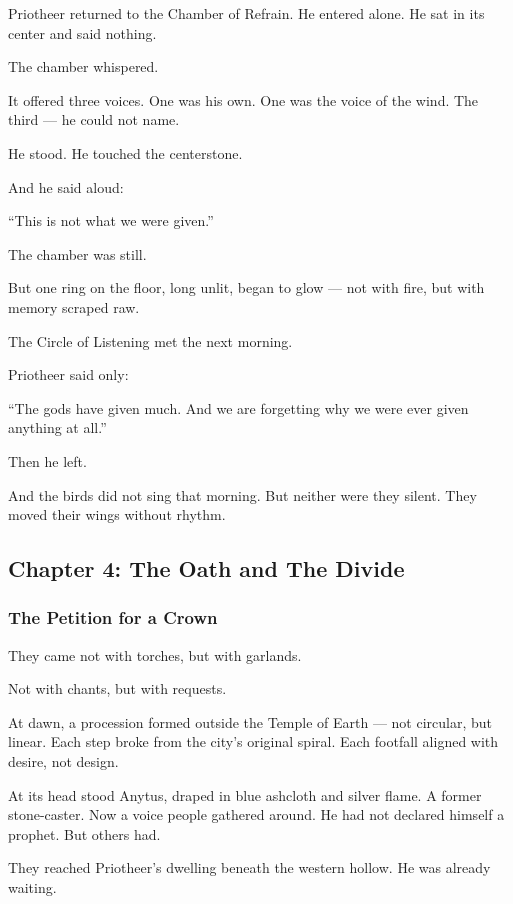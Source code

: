 \documentclass[12pt]{article}
\begin{document}
Priotheer returned to the Chamber of Refrain.  
He entered alone.  
He sat in its center and said nothing.

The chamber whispered.

It offered three voices.  
One was his own.  
One was the voice of the wind.  
The third — he could not name.

He stood.  
He touched the centerstone.

And he said aloud:

 “This is not what we were given.”

The chamber was still.

But one ring on the floor, long unlit,  
began to glow — not with fire,  
but with memory scraped raw.

The Circle of Listening met the next morning.

Priotheer said only:

 “The gods have given much.  
 And we are forgetting why we were ever given anything at all.”

Then he left.

And the birds did not sing that morning.  
But neither were they silent.  
They moved their wings without rhythm.

\newpage

\subsection*{Chapter 4: The Oath and The Divide}

\vspace{.5in}

\subsubsection*{The Petition for a Crown}

They came not with torches, but with garlands.

Not with chants, but with requests.

At dawn, a procession formed outside the Temple of Earth —  
not circular, but linear.  
Each step broke from the city's original spiral.  
Each footfall aligned with desire, not design.

At its head stood Anytus, draped in blue ashcloth and silver flame.  
A former stone-caster. Now a voice people gathered around.  
He had not declared himself a prophet.  
But others had.

They reached Priotheer's dwelling beneath the western hollow.  
He was already waiting.
\end{document}
